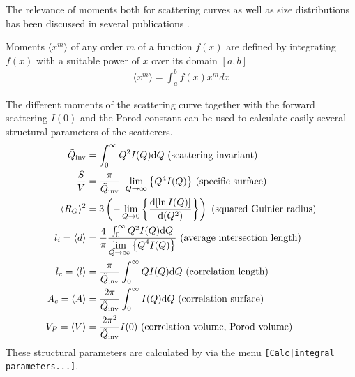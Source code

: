The relevance of moments both for scattering curves as well as size
distributions has been discussed in several publications
\cite{Damaschun1969,Sjoberg1974,Damaschun1971,Walter1985,Moller1995,book:Guinier:Fournet}.

Moments $ \langle x^m\rangle$ of any order $m$ of a function $f(x)$
are defined by integrating $f(x)$  with a suitable power of $x$ over
its domain $[a,b]$
\begin{align}
 \langle x^m\rangle = \displaystyle  \int_a^b f(x) x^m dx
\end{align}

The different moments of the scattering curve together with the
forward scattering $I(0)$ and the Porod constant can be used to
calculate easily several structural parameters of the scatterers.
\begin{subequations}
\begin{align}
\tilde{Q}_\text{inv} &= \int_0^\infty Q^2I(Q) \mathrm{d}Q \mbox{ (scattering invariant)} \\
\frac{S}{V} &= \frac{\pi}{\tilde{Q}_\text{inv}} \;\; {\DS\lim_{Q \to \infty}\left\{Q^4I(Q)\right\}} \mbox{ (specific surface)} \\
\langle R_G \rangle^2 &= 3\left(-\DS\lim_{Q \to 0}\left\{\frac{\mathrm{d}[\ln I(Q)]}{\mathrm{d}(Q^2)}\right\}\right) \mbox{ (squared Guinier radius)} \\
l_i=\langle d \rangle &= \frac{4}{\pi}\frac{\int_0^\infty Q^2I(Q) \mathrm{d}Q}{\DS\lim_{Q \to \infty}\left\{Q^4I(Q)\right\}} \mbox{ (average intersection length)} \\
l_c=\langle l \rangle &= \frac{\pi}{\tilde{Q}_\text{inv}} \int_0^\infty QI(Q) \mathrm{d}Q \mbox{ (correlation length)} \\
A_c=\langle A \rangle &= \frac{2\pi}{\tilde{Q}_\text{inv}}\int_0^\infty I(Q) \mathrm{d}Q \mbox{ (correlation surface)} \\
V_P=\langle V \rangle &= \frac{2\pi^2}{\tilde{Q}_\text{inv}} I(0)
\mbox{ (correlation volume, Porod volume)}
\end{align}
\end{subequations}
These structural parameters are calculated by \SASfit via the menu
\texttt{[Calc|integral parameters...]}.


